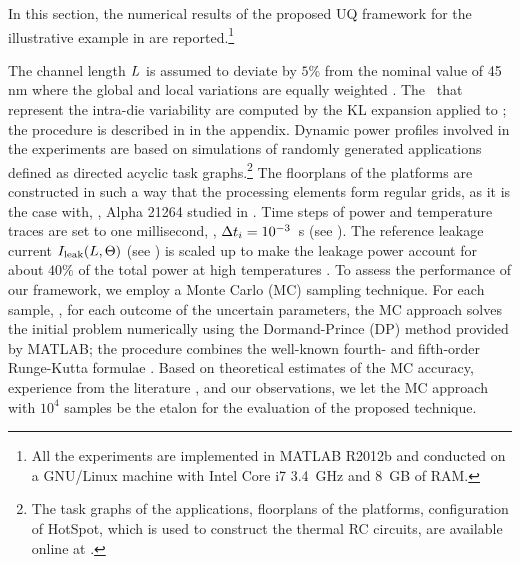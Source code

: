 In this section, the numerical results of the proposed UQ framework for the illustrative example in  are reported.\footnote{All the experiments are implemented in MATLAB R2012b \cite{matlab} and conducted on a GNU/Linux machine with Intel Core i7 3.4~GHz and 8~GB of RAM.}

The channel length $L$ is assumed to deviate by $5\%$ from the nominal value of 45 nm where the global and local variations are equally weighted \cite{juan2011, juan2012}. The \rvs\ that represent the intra-die variability are computed by the KL expansion applied to ; the procedure is described in  in the appendix. Dynamic power profiles involved in the experiments are based on simulations of randomly generated applications defined as directed acyclic task graphs.\footnote{The task graphs of the applications, floorplans of the platforms, configuration of HotSpot, which is used to construct the thermal RC circuits, are available online at \cite{sources}.} The floorplans of the platforms are constructed in such a way that the processing elements form regular grids, as it is the case with, \eg, Alpha 21264 studied in \cite{juan2011}. Time steps of power and temperature traces are set to one millisecond, \ie, $\Delta t_i = 10^{-3}$~s (see ). The reference leakage current $I_{\text{leak}}(L, \Theta)$ (see ) is scaled up to make the leakage power account for about $40\%$ of the total power at high temperatures \cite{liu2007}. To assess the performance of our framework, we employ a Monte Carlo (MC) sampling technique. For each sample, \ie, for each outcome of the uncertain parameters, the MC approach solves the initial problem numerically using the Dormand-Prince (DP) method provided by MATLAB; the procedure combines the well-known fourth- and fifth-order Runge-Kutta formulae \cite{press2007}. Based on theoretical estimates \cite{diaz-emparanza2002} of the MC accuracy, experience from the literature \cite{xiu2010, eldred2009, maitre2010, shen2009}, and our observations, we let the MC approach with $10^4$ samples be the etalon for the evaluation of the proposed technique.


